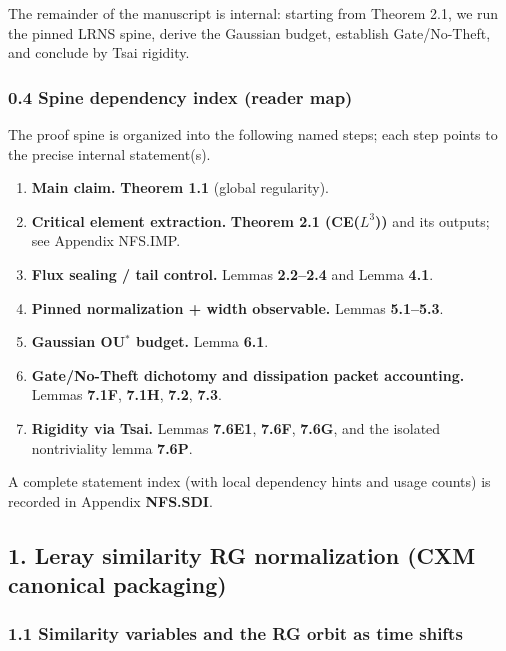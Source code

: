 \documentclass[
  11pt,
]{article}
\providecommand{\tightlist}{%
  \setlength{\itemsep}{0pt}\setlength{\parskip}{0pt}}
\begin{document}
The remainder of the manuscript is internal: starting from Theorem 2.1, we run the pinned LRNS spine, derive the Gaussian budget, establish Gate/No-Theft, and conclude by Tsai rigidity.

\hypertarget{spine-dependency-index-reader-map}{%
\subsubsection{0.4 Spine dependency index (reader map)}\label{spine-dependency-index-reader-map}}

The proof spine is organized into the following named steps; each step points to the precise internal statement(s).

\begin{enumerate}
\def\labelenumi{\arabic{enumi}.}
\tightlist
\item
  \textbf{Main claim.} \textbf{Theorem 1.1} (global regularity).
\item
  \textbf{Critical element extraction.} \textbf{Theorem 2.1 (CE(\(L^3\)))} and its outputs; see Appendix NFS.IMP.
\item
  \textbf{Flux sealing / tail control.} Lemmas \textbf{2.2--2.4} and Lemma \textbf{4.1}.
\item
  \textbf{Pinned normalization + width observable.} Lemmas \textbf{5.1--5.3}.
\item
  \textbf{Gaussian OU\(^\ast\) budget.} Lemma \textbf{6.1}.
\item
  \textbf{Gate/No-Theft dichotomy and dissipation packet accounting.} Lemmas \textbf{7.1F}, \textbf{7.1H}, \textbf{7.2}, \textbf{7.3}.
\item
  \textbf{Rigidity via Tsai.} Lemmas \textbf{7.6E1}, \textbf{7.6F}, \textbf{7.6G}, and the isolated nontriviality lemma \textbf{7.6P}.
\end{enumerate}

A complete statement index (with local dependency hints and usage counts) is recorded in Appendix \textbf{NFS.SDI}.

\hypertarget{leray-similarity-rg-normalization-cxm-canonical-packaging}{%
\subsection{1. Leray similarity RG normalization (CXM canonical packaging)}\label{leray-similarity-rg-normalization-cxm-canonical-packaging}}

\hypertarget{similarity-variables-and-the-rg-orbit-as-time-shifts}{%
\subsubsection{1.1 Similarity variables and the RG orbit as time shifts}\label{similarity-variables-and-the-rg-orbit-as-time-shifts}}
\end{document}
